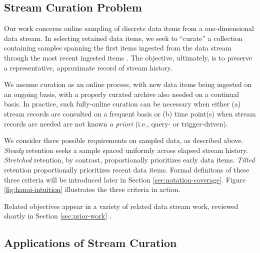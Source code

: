 \subsection{Stream Curation Problem}

Our work concerns online sampling of discrete data items from a one-dimensional data stream.
In selecting retained data items, we seek to ``curate'' a collection containing samples spanning the first items ingested from the data stream through the most recent ingested items \citep{moreno2024algorithms}.
The objective, ultimately, is to preserve a representative, approximate record of stream history.

We assume curation as an online process, with new data items being ingested on an ongoing basis, with a properly curated archive also needed on a continual basis.
In practice, such fully-online curation can be necessary when either (a) stream records are consulted on a frequent basis or (b) time point(s) when stream records are needed are not known \textit{a priori} (i.e., query- or trigger-driven).



We consider three possible requirements on sampled data, as described above.
\textit{{Steady}} retention seeks a sample spaced uniformly across elapsed stream history.
\textit{{Stretched}} retention, by contrast, proportionally prioritizes early data items.
\textit{{Tilted}} retention proportionally prioritizes recent data items.
Formal definitons of these three criteria will be introduced later in Section \ref{sec:notation-coverage}.
Figure \ref{fig:hanoi-intuition} illustrates the three criteria in action.

Related objectives appear in a variety of related data stream work, reviewed shortly in Section \ref{sec:prior-work} \citep{aggarwal2003framework,han2005stream}.


\subsection{Applications of Stream Curation}

